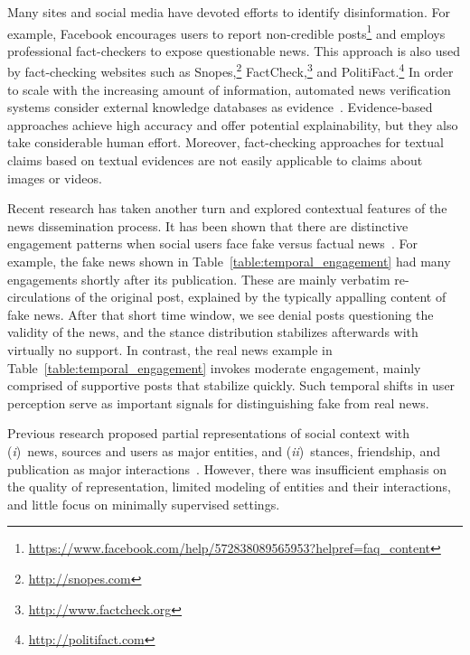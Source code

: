 \documentclass[sigconf,anonymous]{acmart}
\theoremstyle{definition}
\theoremstyle{hypothesis}
\begin{document}
Many sites and social media have devoted efforts to identify disinformation. For example, Facebook encourages users to report non-credible posts\footnote{\scriptsize{\url{https://www.facebook.com/help/572838089565953?helpref=faq_content}}} and employs professional fact-checkers to expose questionable news. This approach is also used by fact-checking websites such as Snopes,\footnote{\scriptsize{\url{http://snopes.com}}} FactCheck,\footnote{\url{http://www.factcheck.org}} and PolitiFact.\footnote{\scriptsize{\url{http://politifact.com}}} In order to scale with the increasing amount of information, automated news verification systems consider external knowledge databases as evidence~\cite{hassan2017claimbuster,thorne2017extensible,popat2018credeye,augenstein-etal-2019-multifc}. Evidence-based approaches achieve high accuracy and offer potential explainability, but they also take considerable human effort.
Moreover, fact-checking approaches for textual claims based on textual evidences are not easily applicable to claims about images or videos.

Recent research has taken another turn and explored contextual features of the news dissemination process. It has been shown that there are distinctive engagement patterns when social users face fake versus factual news~\cite{ma2016detecting,jin2016news}.
For example, the fake news shown in Table~\ref{table:temporal_engagement} had many engagements shortly after its publication. These are mainly verbatim 
re-circulations of the original post, 
explained by the typically appalling content of fake news. After that short time window, we see denial 
posts questioning the validity of the news, and the stance distribution stabilizes afterwards with virtually no support. In contrast, the real news example in Table~\ref{table:temporal_engagement} invokes moderate engagement, mainly comprised of supportive posts that stabilize quickly. Such temporal shifts in user perception serve as important signals for distinguishing fake from real news. 

Previous research proposed partial representations of social context with (\emph{i})~news, sources and users as major entities, and (\emph{ii})~stances, friendship, and publication as major interactions~\cite{jin2014news,popat2017truth,shu2019beyond,popat2016credibility}. However, there was insufficient emphasis on the quality of representation, limited modeling of entities and their interactions, and little focus on minimally supervised settings. 
\end{document}
